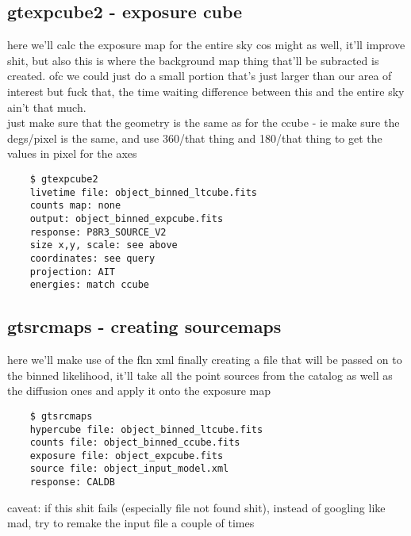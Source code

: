 \documentclass{article}
\begin{document}
\subsection{gtexpcube2 - exposure cube}%
here we'll calc the exposure map for the entire sky cos might as well, it'll improve shit, but also this is where the background map thing that'll be subracted is created. ofc we could just do a small portion that's just larger than our area of interest but fuck that, the time waiting difference between this and the entire sky ain't that much.\\
just make sure that the geometry is the same as for the ccube - ie make sure the degs/pixel is the same, and use 360/that thing and 180/that thing to get the values in pixel for the axes
\begin{verbatim}
    $ gtexpcube2
    livetime file: object_binned_ltcube.fits
    counts map: none
    output: object_binned_expcube.fits
    response: P8R3_SOURCE_V2
    size x,y, scale: see above
    coordinates: see query
    projection: AIT
    energies: match ccube
\end{verbatim}

\subsection{gtsrcmaps - creating sourcemaps}%
here we'll make use of the fkn xml finally creating a file that will be passed on to the binned likelihood, it'll take all the point sources from the catalog as well as the diffusion ones and apply it onto the exposure map
\begin{verbatim}
    $ gtsrcmaps
    hypercube file: object_binned_ltcube.fits
    counts file: object_binned_ccube.fits
    exposure file: object_expcube.fits
    source file: object_input_model.xml
    response: CALDB
\end{verbatim}
caveat: if this shit fails (especially file not found shit), instead of googling like mad, try to remake the input file a couple of times
\end{document}
